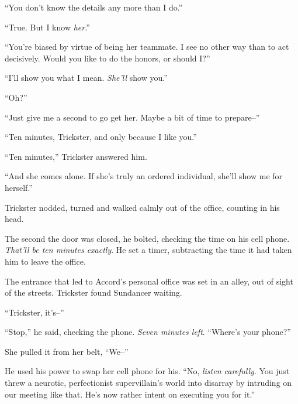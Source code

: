 ``You don't know the details any more than I do.''



``True.  But I know \emph{her}.''



``You're biased by virtue of being her teammate.  I see no other way than to act decisively.  Would you like to do the honors, or should I?''



``I'll show you what I mean.  \emph{She'll} show you.''



``Oh?''



``Just give me a second to go get her.  Maybe a bit of time to prepare--''



``Ten minutes, Trickster, and only because I like you.''



``Ten minutes,'' Trickster answered him.



``And she comes alone.  If she's truly an ordered individual, she'll show me for herself.''



Trickster nodded, turned and walked calmly out of the office, counting in his head.



The second the door was closed, he bolted, checking the time on his cell phone.  \emph{That'll be ten minutes exactly}.  He set a timer, subtracting the time it had taken him to leave the office.



The entrance that led to Accord's personal office was set in an alley, out of sight of the streets.  Trickster found Sundancer waiting.



``Trickster, it's--''



``Stop,'' he said, checking the phone.  \emph{Seven minutes left}.  ``Where's your phone?''



She pulled it from her belt, ``We--''



He used his power to swap her cell phone for his.  ``No, \emph{listen carefully}.  You just threw a neurotic, perfectionist supervillain's world into disarray by intruding on our meeting like that.  He's now rather intent on executing you for it.''



